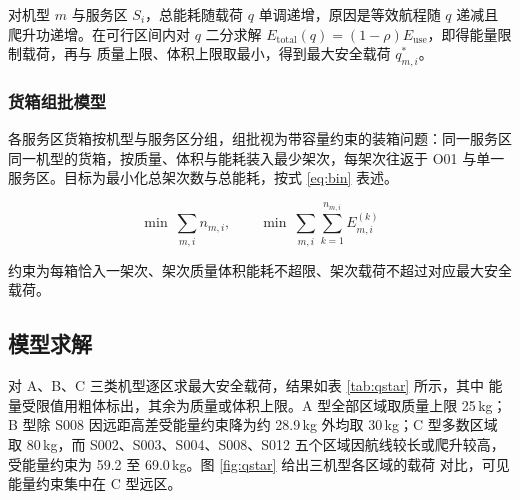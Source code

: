 对机型 $m$ 与服务区 $S_i$，总能耗随载荷 $q$ 单调递增，原因是等效航程随
$q$ 递减且爬升功递增。在可行区间内对 $q$ 二分求解
$E_{\mathrm{total}}(q)=(1-\rho)E_{\mathrm{use}}$，即得能量限制载荷，再与
质量上限、体积上限取最小，得到最大安全载荷 $q^*_{m,i}$。

\subsubsection{货箱组批模型}

各服务区货箱按机型与服务区分组，组批视为带容量约束的装箱问题：同一服务区
同一机型的货箱，按质量、体积与能耗装入最少架次，每架次往返于 O01 与单一
服务区。目标为最小化总架次数与总能耗，按式 \eqref{eq:bin} 表述。

\begin{equation}
\min \ \sum_{m,i} n_{m,i}, \qquad
\min \ \sum_{m,i}\sum_{k=1}^{n_{m,i}} E^{(k)}_{m,i}
\label{eq:bin}
\end{equation}

约束为每箱恰入一架次、架次质量体积能耗不超限、架次载荷不超过对应最大安全
载荷。

\subsection{模型求解}

对 A、B、C 三类机型逐区求最大安全载荷，结果如表 \ref{tab:qstar} 所示，其中
能量受限值用粗体标出，其余为质量或体积上限。A 型全部区域取质量上限 25\,kg；
B 型除 S008 因远距高差受能量约束降为约 28.9\,kg 外均取 30\,kg；C 型多数区域
取 80\,kg，而 S002、S003、S004、S008、S012 五个区域因航线较长或爬升较高，
受能量约束为 59.2 至 69.0\,kg。图 \ref{fig:qstar} 给出三机型各区域的载荷
对比，可见能量约束集中在 C 型远区。

\begin{table}[htbp]
\centering
\caption{各机型到各服务区的最大安全载荷（kg）}
\label{tab:qstar}
\end{table}

